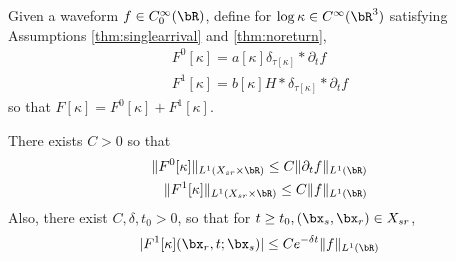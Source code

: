 Given a waveform $f \in C^{\infty}_0(\bR)$, define for $\log \kappa
\in C^{\infty}(\bR^3)$ satisfying Assumptions \ref{thm:singlearrival}
and \ref{thm:noreturn},
\begin{eqnarray}
  \label{eqn:fdefs0}
  F^0[\kappa] = a[\kappa] \delta_{\tau[\kappa]} * \partial_t f \\
    \label{eqn:fdefs1}
  F^1[\kappa] = b[\kappa]H*\delta_{\tau[\kappa]} * \partial_t f
\end{eqnarray}
so that $F[\kappa] = F^0[\kappa] + F^1[\kappa]$. 

\begin{prop}
  \label{thm:fbounds}
  There exists $C>0$ so that
  \begin{eqnarray}
    \label{eqn:f0bnd}
    \|F^0[\kappa]\|_{L^1(X_{sr} \times \bR)} \le C\|\partial_t 
    f\|_{L^1(\bR)}\\
    \label{eqn:f1bnd}
    \|F^1[\kappa]\|_{L^1(X_{sr} \times \bR)} \le C\| f\|_{L^1(\bR)}
  \end{eqnarray}
  Also, there exist $C, \delta, t_0>0$, so that for $t \ge t_0, (\bx_s,\bx_r)
  \in X_{sr}$,
  \begin{equation}
    \label{eqn:f1asymp}
    |F^1[\kappa](\bx_r,t;\bx_s)| \le C e^{-\delta t}\| f\|_{L^1(\bR)}
  \end{equation}
\end{prop}

